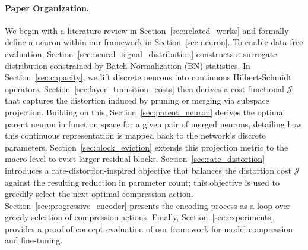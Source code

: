 \documentclass[11pt, a4paper, copyright, gdm]{google}
\newcommand{\calJ}{\mathcal{J}}
\theoremstyle{definition}
\begin{document}
\paragraph{Paper Organization.} We begin with a literature review in Section~\ref{sec:related_works} and formally define a neuron within our framework in Section~\ref{sec:neuron}. To enable data-free evaluation, Section~\ref{sec:neural_signal_distribution} constructs a surrogate distribution constrained by Batch Normalization (BN) statistics. In Section~\ref{sec:capacity}, we lift discrete neurons into continuous Hilbert-Schmidt operators. Section~\ref{sec:layer_transition_costs} then derives a cost functional $\calJ$ that captures the distortion induced by pruning or merging via subspace projection. Building on this, Section~\ref{sec:parent_neuron} derives the optimal parent neuron in function space for a given pair of merged neurons, detailing how this continuous representation is mapped back to the network's discrete parameters. Section~\ref{sec:block_eviction} extends this projection metric to the macro level to evict larger residual blocks. Section~\ref{sec:rate_distortion} introduces a rate-distortion-inspired objective that balances the distortion cost $\calJ$ against the resulting reduction in parameter count; this objective is used to greedily select the next optimal compression action. Section~\ref{sec:progressive_encoder} presents the encoding process as a loop over greedy selection of compression actions. Finally, Section~\ref{sec:experiments} provides a proof-of-concept evaluation of our framework for model compression and fine-tuning.
\end{document}
